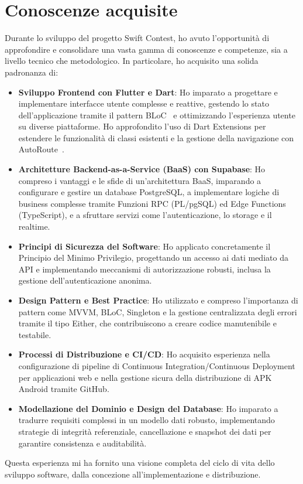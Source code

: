 \section{Conoscenze acquisite}\label{sec:conoscenze-acquisite}
Durante lo sviluppo del progetto Swift Contest, ho avuto l'opportunità di approfondire e consolidare una vasta gamma di conoscenze e competenze, sia a livello tecnico che metodologico.
In particolare, ho acquisito una solida padronanza di:
\begin{itemize}
    \item \textbf{Sviluppo Frontend con Flutter e Dart}: Ho imparato a progettare e implementare interfacce utente complesse e reattive, gestendo lo stato dell'applicazione tramite il pattern BLoC~\cite{bloc_docs} e ottimizzando l'esperienza utente su diverse piattaforme.
    Ho approfondito l'uso di Dart Extensions per estendere le funzionalità di classi esistenti e la gestione della navigazione con AutoRoute~\cite{auto_route_package}.
    \item \textbf{Architetture Backend-as-a-Service (BaaS) con Supabase}: Ho compreso i vantaggi e le sfide di un'architettura BaaS, imparando a configurare e gestire un database PostgreSQL, a implementare logiche di business complesse tramite Funzioni RPC (PL/pgSQL) ed Edge Functions (TypeScript), e a sfruttare servizi come l'autenticazione, lo storage e il realtime.
    \item \textbf{Principi di Sicurezza del Software}: Ho applicato concretamente il Principio del Minimo Privilegio, progettando un accesso ai dati mediato da API e implementando meccanismi di autorizzazione robusti, inclusa la gestione dell'autenticazione anonima.
    \item \textbf{Design Pattern e Best Practice}: Ho utilizzato e compreso l'importanza di pattern come MVVM, BLoC, Singleton e la gestione centralizzata degli errori tramite il tipo Either, che contribuiscono a creare codice manutenibile e testabile.
    \item \textbf{Processi di Distribuzione e CI/CD}: Ho acquisito esperienza nella configurazione di pipeline di Continuous Integration/Continuous Deployment per applicazioni web e nella gestione sicura della distribuzione di APK Android tramite GitHub.
    \item \textbf{Modellazione del Dominio e Design del Database}: Ho imparato a tradurre requisiti complessi in un modello dati robusto, implementando strategie di integrità referenziale, cancellazione e snapshot dei dati per garantire consistenza e auditabilità.
\end{itemize}
Questa esperienza mi ha fornito una visione completa del ciclo di vita dello sviluppo software, dalla concezione all'implementazione e distribuzione.

